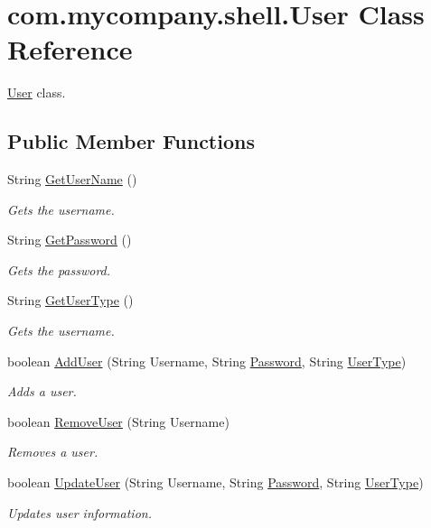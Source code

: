\hypertarget{classcom_1_1mycompany_1_1shell_1_1User}{}\section{com.\+mycompany.\+shell.\+User Class Reference}
\label{classcom_1_1mycompany_1_1shell_1_1User}


\hyperlink{classcom_1_1mycompany_1_1shell_1_1User}{User} class.  


\subsection*{Public Member Functions}
\begin{DoxyCompactItemize}
\item 
String \hyperlink{group__TechnicalDetails_ga7a04eb11e9e107366bf95862e5516aec}{Get\+User\+Name} ()
\begin{DoxyCompactList}\small\item\em Gets the username. \end{DoxyCompactList}\item 
String \hyperlink{group__TechnicalDetails_ga2fd008e836a8968a40bf5f0b8b02cfa2}{Get\+Password} ()
\begin{DoxyCompactList}\small\item\em Gets the password. \end{DoxyCompactList}\item 
String \hyperlink{group__TechnicalDetails_gaba3042d4abc0586fdb28bc7692ad300d}{Get\+User\+Type} ()
\begin{DoxyCompactList}\small\item\em Gets the username. \end{DoxyCompactList}\item 
boolean \hyperlink{group__TechnicalDetails_ga6fdcc50f5df5e2a409d9a5bb0ae2f4f3}{Add\+User} (String Username, String \hyperlink{classcom_1_1mycompany_1_1shell_1_1User_a97addebba6620b23c6ad9a74cc2d4d97}{Password}, String \hyperlink{classcom_1_1mycompany_1_1shell_1_1User_a7adda82096915c29abc7abdfd999d24d}{User\+Type})
\begin{DoxyCompactList}\small\item\em Adds a user. \end{DoxyCompactList}\item 
boolean \hyperlink{group__TechnicalDetails_ga87fcb60481678e35850283b557bba02d}{Remove\+User} (String Username)
\begin{DoxyCompactList}\small\item\em Removes a user. \end{DoxyCompactList}\item 
boolean \hyperlink{group__TechnicalDetails_ga5b408be81e56874edbb63c3e41676758}{Update\+User} (String Username, String \hyperlink{classcom_1_1mycompany_1_1shell_1_1User_a97addebba6620b23c6ad9a74cc2d4d97}{Password}, String \hyperlink{classcom_1_1mycompany_1_1shell_1_1User_a7adda82096915c29abc7abdfd999d24d}{User\+Type})
\begin{DoxyCompactList}\small\item\em Updates user information. \end{DoxyCompactList}\end{DoxyCompactItemize}
